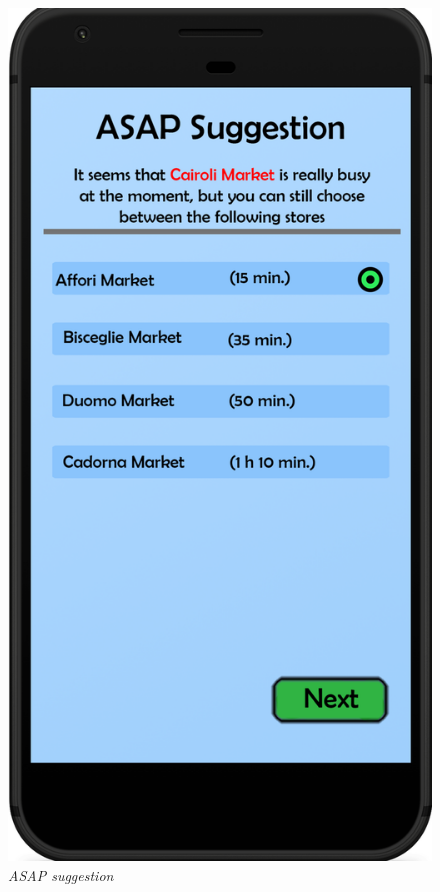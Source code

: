 \documentclass{article}
\begin{document}
		\begin{figure}[!h]
			\centering
			\begin{minipage}[!h]{0.4\textwidth}
				\includegraphics[width=\textwidth]{../Mockups/ASAPSuggestion.png}
				\caption{\emph{ASAP suggestion}}

\end{minipage}
\end{figure}
\end{document}
